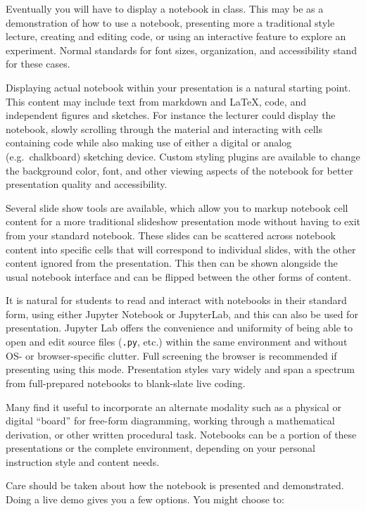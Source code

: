 \documentclass[]{book}
\begin{document}
Eventually you will have to display a notebook in class. This may be as a
demonstration of how to use a notebook, presenting more a traditional style
lecture, creating and editing code, or using an interactive feature to explore
an experiment. Normal standards for font sizes, organization, and accessibility
stand for these cases.

Displaying actual notebook within your presentation is a natural starting point.
This content may include text from markdown and LaTeX, code, and independent
figures and sketches. For instance the lecturer could display the notebook,
slowly scrolling through the material and interacting with cells containing code
while also making use of either a digital or analog (e.g.~chalkboard) sketching
device. Custom styling plugins are available to change the background color,
font, and other viewing aspects of the notebook for better presentation quality
and accessibility.

Several slide show tools are available, which allow you to markup notebook cell
content for a more traditional slideshow presentation mode without having to
exit from your standard notebook. These slides can be scattered across notebook
content into specific cells that will correspond to individual slides, with the
other content ignored from the presentation. This then can be shown alongside
the usual notebook interface and can be flipped between the other forms of
content.

It is natural for students to read and interact with notebooks in their standard
form, using either Jupyter Notebook or JupyterLab, and this can also be used for
presentation. Jupyter Lab offers the convenience and uniformity of being able to
open and edit source files (\texttt{.py}, etc.) within the same environment and without
OS- or browser-specific clutter. Full screening the browser is recommended if
presenting using this mode. Presentation styles vary widely and span a spectrum
from full-prepared notebooks to blank-slate live coding.

Many find it useful to incorporate an alternate modality such as a physical or
digital ``board'' for free-form diagramming, working through a mathematical
derivation, or other written procedural task. Notebooks can be a portion of
these presentations or the complete environment, depending on your personal
instruction style and content needs.

Care should be taken about how the notebook is presented and demonstrated. Doing
a live demo gives you a few options. You might choose to:
\end{document}

